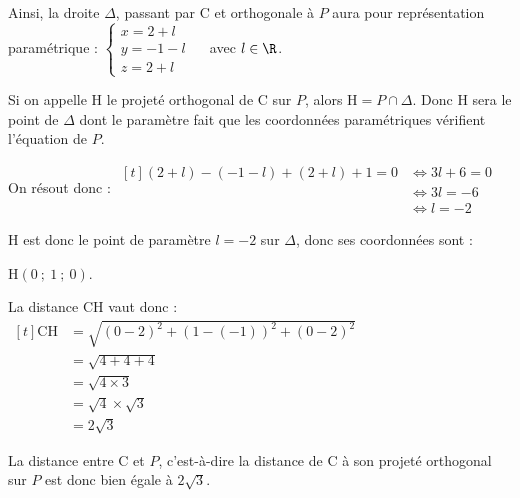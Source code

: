 \begin{enumerate}
	Ainsi, la droite $\Delta$, passant par C et orthogonale à $P$ aura pour représentation paramétrique : \quad $\begin{cases} x = 2 + l\\y = -1 - l\\ z= 2 + l\end{cases}\quad$ avec $l\in\R$.

	Si on appelle H le projeté orthogonal de C sur $P$, alors $\mathrm{H} = P \cap \Delta$. Donc H sera le point de $\Delta$ dont le paramètre fait que les coordonnées paramétriques vérifient l'équation de $P$.

	On résout donc :  \quad $\begin{aligned}[t]
		(2 + l) - (-1 - l) + (2 + l) + 1 = 0 &\iff 3l + 6 = 0\\
		&\iff 3l = -6\\
		&\iff l = -2
	\end{aligned}$

	H est donc le point de paramètre $l = -2$ sur $\Delta$, donc ses coordonnées sont :

	$\mathrm{H} (0 ~;~ 1 ~;~ 0)$.

	La distance CH vaut donc : \quad $\begin{aligned}[t]
		\mathrm{CH} &= \sqrt{(0 - 2)^2 + (1 - (-1))^2 + (0 - 2)^2}\\
			&=\sqrt{4 + 4 + 4}\\
			&=\sqrt{4\times 3}\\
			&=\sqrt{4}\times \sqrt{3}\\
			&=2\sqrt{3}
	\end{aligned}$

	La distance entre C et $P$, c'est-à-dire la distance de C à son projeté orthogonal sur $P$ est donc bien égale à $2\sqrt{3}$.



\end{enumerate}
\medskip
